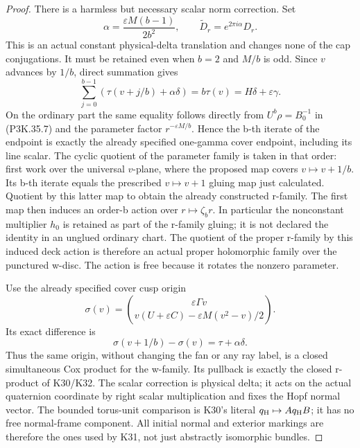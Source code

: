 \begin{proof}
There is a harmless but necessary scalar norm correction. Set
\[
 \alpha=\frac{\varepsilon M(b-1)}{2b^2},\qquad
 \widetilde D_r=e^{2\pi i\alpha}D_r.
                                                               \tag{P3K.35.18}
\]
This is an actual constant physical-delta translation and changes
none of the cap conjugations. It must be retained even when
\(b=2\) and \(M/b\) is odd. Since \(v\) advances by \(1/b\),
direct summation gives
\[
 \sum_{j=0}^{b-1}(\tau(v+j/b)+\alpha\delta)
                         =b\tau(v)=H\delta+\varepsilon\gamma.
                                                               \tag{P3K.35.19}
\]
On the ordinary part the same equality follows directly from
\(U^b\rho=B_0^{-1}\) in (P3K.35.7) and the parameter factor
\(r^{-\varepsilon M/b}\). Hence the b-th iterate of the
endpoint is exactly the already specified one-gamma cover
endpoint, including its line scalar. The cyclic quotient of the
parameter family is taken in that order: first work over the
universal \(v\)-plane, where the proposed map covers
\(v\mapsto v+1/b\). Its b-th iterate equals the prescribed
\(v\mapsto v+1\) gluing map just calculated. Quotient by this
latter map to obtain the already constructed r-family. The first
map then induces an order-b action over \(r\mapsto\zeta_b r\).
In particular the nonconstant multiplier \(h_0\) is retained
as part of the r-family gluing; it is not declared the identity
in an unglued ordinary chart. The quotient of the
proper r-family by this induced deck action is therefore an actual
proper holomorphic family over the punctured w-disc. The action
is free because it rotates the nonzero parameter.

Use the already specified cover cusp origin
\[
 \sigma(v)=\binom{\varepsilon\Gamma v}
                {v(U+\varepsilon C)-\varepsilon M(v^2-v)/2}.
\]
Its exact difference is
\[
               \sigma(v+1/b)-\sigma(v)=\tau+\alpha\delta.
                                                               \tag{P3K.35.20}
\]
Thus the same origin, without changing the fan or any ray label,
is a closed simultaneous Cox product for the w-family. Its
pullback is exactly the closed r-product of K30/K32. The scalar
correction is physical delta; it acts on the actual quaternion
coordinate by right scalar multiplication and fixes the Hopf
normal vector. The bounded torus-unit comparison is K30's
literal \(q_{\rm H}\mapsto A q_{\rm H}B\); it has no free
normal-frame component. All initial normal and exterior markings
are therefore the ones used by K31, not just abstractly
isomorphic bundles.


\end{proof}
